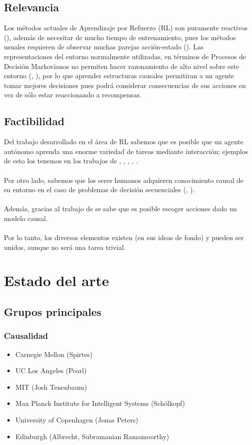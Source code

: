\documentclass[11pt]{article}
\theoremstyle{plain}
\begin{document}
\subsection{Relevancia}
Los métodos actuales de Aprendizaje por Refuerzo (RL) son puramente reactivos (\cite{garnelo2016towards}), además de necesitar de mucho tiempo de entrenamiento, pues los métodos usuales requieren de observar muchas parejas acción-estado (\cite{sutton1998reinforcement}). Las representaciones del entorno normalmente utilizadas, en términos de Procesos de Decisión Markovianos no permiten hacer razonamiento de alto nivel sobre este entorno (\cite{innes2018reasoning}, \cite{garnelo2016towards}), por lo que aprender estructuras causales permitiran a un agente tomar mejores decisiones pues podrá considerar consecuencias de sus acciones en vez de sólo estar reaccionando a recompensas.
\subsection{Factibilidad}
Del trabajo desarrollado en el área de RL sabemos que es posible que un agente autónomo aprenda una enorme variedad de tareas mediante interacción; ejemplos de esto los tenemos en los trabajos de \cite{mnih2013playing}, \cite{mnih2015human}, \cite{silver2016mastering}, \cite{silver2017mastering}, \cite{impala2018}. \\
\\
Por otro lado, sabemos que los seres humanos adquieren conocimiento causal de su entorno en el caso de problemas de decisión secuenciales (\cite{hagmayer2009decision}, \cite{hagmayer2013repeated}).\\
\\
Además, gracias al trabajo de \cite{lattimoreNIPS2016} se sabe que es posible escoger acciones dado un modelo causal.\\
\\
Por lo tanto, los diversos elementos existen (en sus ideas de fondo) y pueden ser unidos, aunque no será una tarea trivial. 
\section{Estado del arte}
\subsection{Grupos principales}
\subsubsection{Causalidad}
\begin{itemize}
\item Carnegie Mellon (Spirtes)
\item UC Los Angeles (Pearl)
\item MIT (Josh Tenenbaum)
\item Max Planck Institute for Intelligent Systems (Schölkopf)
\item University of Copenhagen  (Jonas Peters)
\item Edinburgh (Albrecht, Subramanian Ramamoorthy)
\end{itemize}
\end{document}
